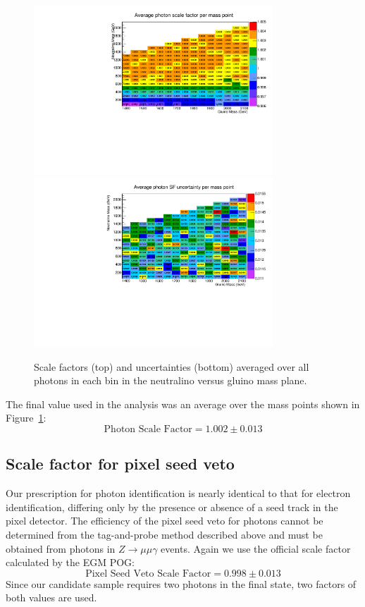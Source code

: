 \begin{figure}[htbp]
    \centering
    \includegraphics[width=0.8\textwidth]{Figures/EventSelect/sfmap.pdf}
    \includegraphics[width=0.8\textwidth]{Figures/EventSelect/sfmap_errors.pdf}
    \caption[Scale factors and uncertainties 
      averaged over all photons in each bin in the neutralino
      versus gluino mass plane.]
      {Scale factors (top) and uncertainties (bottom)
      averaged over all photons in each bin in the neutralino
      versus gluino mass plane.}
    \label{fig:SFmap}
\end{figure}

The final value used in the analysis was an average over the mass
points shown in Figure~\ref{fig:SFmap}:
\begin{equation}
  \textrm{Photon Scale Factor} = 1.002\pm0.013
\end{equation}

\subsection{Scale factor for pixel seed veto}
\label{sec:PSV_SF}
Our prescription for photon identification is nearly identical to that for
electron identification, differing only by the presence or absence of a seed
track in the pixel detector. The efficiency of the pixel seed veto
for photons cannot be determined from the tag-and-probe method described above
and must be obtained from photons in $Z\rightarrow \mu\mu\gamma$
events. Again we use the official scale factor calculated by the
EGM POG:
\begin{equation}
  \textrm{Pixel Seed Veto Scale Factor} = 0.998\pm0.013
\end{equation}
Since our candidate sample requires two photons in the final state,
two factors of both values are used.


